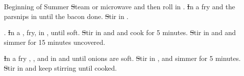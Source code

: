 \documentclass{cookbook}
\begin{document}
\begin{menu}{Beginning of Summer}
{%
	\st	Steam or microwave
		and then roll in
		.
	\st	In a \wok fry
		and the parsnips in
		until the bacon done.
	\st	Stir in
		.
}%

%
{%
	\st	\rice.
	\st	In a \wok,
		fry,
		in 
		,
		until soft.
	\st	Stir in
		and
		and cook for 5 minutes.
	\st	Stir in
		and
		and simmer for 15 minutes uncovered.
}%

%
{%
	\st	In a \wok fry
		, 
		,
		and
		in
		and
		until onions are soft.
	\st	Stir in
		,
		and
		simmer for 5 minutes.
	\st	Stir in 
		and keep stirring until cooked.
}

\end{menu}
\end{document}

